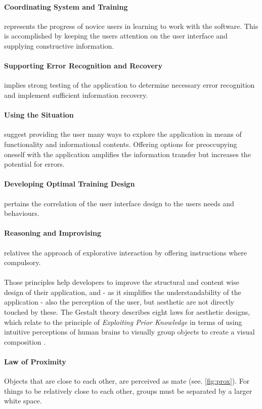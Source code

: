 \paragraph*{Coordinating System and Training} represents the progress of novice users in learning to work with the software. This is accomplished by keeping the users attention on the user interface and supplying constructive information.
\paragraph*{Supporting Error Recognition and Recovery} implies strong testing of the application to determine necessary error recognition and implement sufficient information recovery.
\paragraph*{Using the Situation} suggest providing the user many ways to explore the application in means of functionality and informational contents. Offering options for preoccupying oneself with the application amplifies the information transfer but increases the potential for errors.
\paragraph*{Developing Optimal Training Design} pertains the correlation of the user interface design to the users needs and behaviours. 
\paragraph*{Reasoning and Improvising} relatives the approach of explorative interaction by offering instructions where compulsory.
\paragraph*{} Those principles help developers to improve the structural and content wise design of their application, and - as it simplifies the understandability of the application - also the perception of the user, but aesthetic are not directly touched by these. The Gestalt theory describes eight laws for aesthetic designs, which relate to the principle of \textit{Exploiting Prior Knowledge} in terms of using intuitive perceptions of human brains to visually group objects to create a visual composition \parencite[see.][113]{Sternberg.2012}.
\paragraph*{Law of Proximity} Objects that are close to each other, are perceived as mate (see. \ref{fig:prox}). For things to be relatively close to each other, groups must be separated by a larger white space. \parencite{Seogaard.n.y.}
